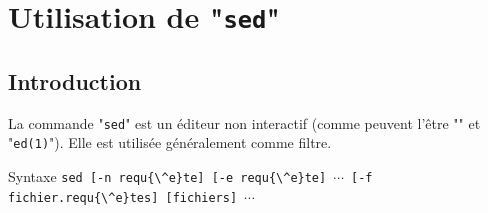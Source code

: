 %
%

\setcounter{remarque-cnt}{1}
\setcounter{example-cnt}{1}
\chapter{\label{adv-fltrs-sed}Utilisation de "{\tt sed}"}
\thispagestyle{fancy}

\section{Introduction}

La commande "{\tt sed}" est un {\'e}diteur non interactif (comme peuvent
l'{\^e}tre "" et "{\tt ed(1)}"). Elle est utilis{\'e}e
g{\'e}n{\'e}ralement comme filtre.

\begin{definition}{Syntaxe}
\verb=sed [-n requ{\^e}te] [-e requ{\^e}te]=~$\cdots$~\verb=[-f fichier.requ{\^e}tes] [fichiers]=~$\cdots$
\end{definition}

